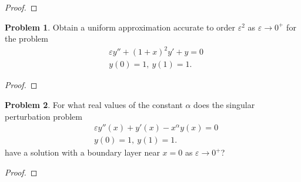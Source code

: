 \documentclass[12pt]{article}
\theoremstyle{definition}
\newtheorem{problem}{Problem}
\begin{document}
\begin{proof}
\end{proof}
\newpage


\begin{problem}
  Obtain a uniform approximation accurate to order $\varepsilon ^2$ as $\varepsilon \to 0^+$
  for the problem
  \begin{align*}
      &\varepsilon y'' + (1+x)^2 y' + y = 0 \\
      &y(0) = 1,\ y(1) = 1.
  \end{align*}
\end{problem}

\begin{proof}
\end{proof}
\newpage


\begin{problem}
  For what real values of the constant $\alpha$ does the singular perturbation
  problem
  \begin{align*}
    &\varepsilon y''(x) + y'(x) - x^\alpha y(x) = 0  \\
    &y(0) = 1,\ y(1) = 1.
  \end{align*}
  have a solution with a boundary layer near $x=0$ as $\varepsilon \to 0^+$?
\end{problem}

\begin{proof}
\end{proof}
\newpage
\end{document}

